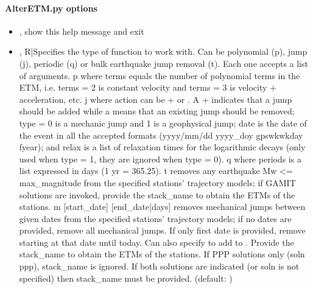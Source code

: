 \documentclass[letterpaper,10pt,english]{sphinxmanual}
\begin{document}
\paragraph{AlterETM.py options}
\label{\detokenize{com:AlterETM.py-options}}\begin{itemize}
\item {} 
\sphinxAtStartPar
{\hyperref[\detokenize{com:AlterETM.py--h}]{}}, {\hyperref[\detokenize{com:AlterETM.py---help}]{}} \sphinxhyphen{} show this help message and exit

\item {} 
\sphinxAtStartPar
{\hyperref[\detokenize{com:AlterETM.py--fun}]{}} , {\hyperref[\detokenize{com:AlterETM.py---function_type}]{}}  \sphinxhyphen{} R|Specifies the type of function to work with. Can be polynomial (p), jump (j), periodic (q) or bulk earthquake jump removal (t). Each one accepts a list of arguments.
p  where terms equals the number of polynomial terms in the ETM, i.e. terms = 2 is constant velocity and terms = 3 is velocity + acceleration, etc.
j     where action can be + or \sphinxhyphen{}. A + indicates that a jump should be added while a \sphinxhyphen{} means that an existing jump should be removed; type = 0 is a mechanic jump and 1 is a geophysical jump; date is the date of the event in all the accepted formats (yyyy/mm/dd yyyy\_doy gpswk\sphinxhyphen{}wkday fyear); and relax is a list of relaxation times for the logarithmic decays (only used when type = 1, they are ignored when type = 0).
q  where periods is a list expressed in days (1 yr = 365.25).
t   removes any earthquake Mw \textless{}= max\_magnitude from the specified stations’ trajectory models; if GAMIT solutions are invoked, provide the stack\_name to obtain the ETMs of the stations.
m  {[}start\_date{]} {[}end\_date|days{]} removes mechanical jumps between given dates from the specified stations’ trajectory models; if no dates are provided, remove all mechanical jumps. If only first date is provided, remove starting at that date until today. Can also specify   to add to . Provide the stack\_name to obtain the ETMs of the stations. If PPP solutions only (\sphinxhyphen{}soln ppp), stack\_name is ignored. If both solutions are indicated (or \sphinxhyphen{}soln is not specified) then stack\_name must be provided. (default: \sphinxcode{\sphinxupquote{{[}{]}}})


\end{itemize}
\end{document}
